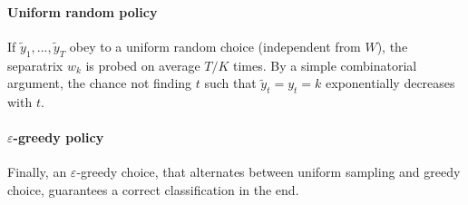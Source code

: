 \documentclass[preprint,12pt,authoryear]{elsarticle}
\begin{document}
	\paragraph{Uniform random policy} If $\tilde{y}_1, ...,\tilde{y}_T$ obey to a uniform random choice (independent from $W$), the separatrix $w_k$ is probed on average $T/K$ times. By a simple combinatorial argument, the chance not finding $t$ such that $\tilde{y}_t = y_t = k$ exponentially decreases with $t$.
	\paragraph{$\varepsilon$-greedy policy} Finally, an $\varepsilon$-greedy choice, that alternates between uniform sampling and greedy choice, guarantees a correct classification in the end.  

\end{document}
